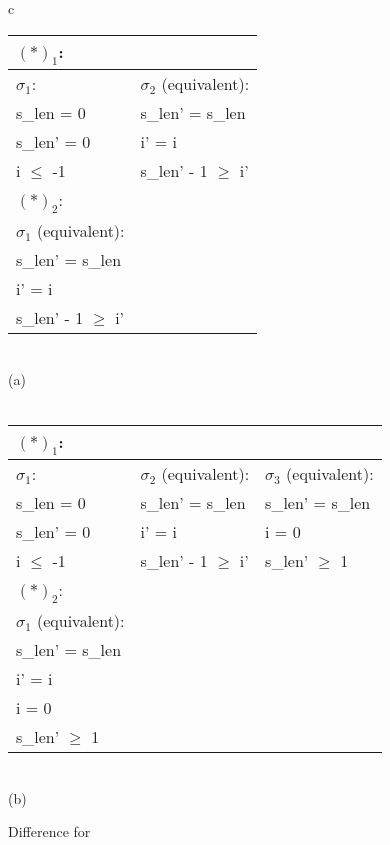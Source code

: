 \begin{figure}
\scriptsize
\centering
\begin{tabular}{c}
\begin{tabular}{l|l}
\multicolumn{2}{l}{$(*)_1$:}
\\ \hline
$\sigma_1$:     & $\sigma_2$ (equivalent):
\\ \hline
s\_len = 0      & s\_len' = s\_len
\\
s\_len' = 0     & i' = i
\\
i $\leq$ -1     & s\_len' - 1 $\geq$ i'
\\ \hline
\multicolumn{2}{l}{$(*)_2$:}
\\ \hline
$\sigma_1$ (equivalent):
\\ \hline
s\_len' = s\_len
\\
i' = i
\\
s\_len' - 1 $\geq$ i'
\\ \hline
\end{tabular}
\\ (a) \\ \\
\begin{tabular}{l|l|l}
\multicolumn{2}{l}{$(*)_1$:}
\\ \hline
$\sigma_1$:     & $\sigma_2$ (equivalent):  & $\sigma_3$ (equivalent):
\\ \hline
s\_len = 0      & s\_len' = s\_len          & s\_len' = s\_len
\\
s\_len' = 0     & i' = i                    & i = 0
\\
i $\leq$ -1     & s\_len' - 1 $\geq$ i'     & s\_len' $\geq$ 1
\\ \hline
\multicolumn{2}{l}{$(*)_2$:}
\\ \hline
$\sigma_1$ (equivalent):
\\ \hline
s\_len' = s\_len
\\
i' = i
\\
i = 0
\\
s\_len' $\geq$ 1
\\ \hline
\end{tabular}
\\ (b)
\end{tabular}
\caption{Difference for  }\label{Fi:bsdSplit}
\end{figure}


